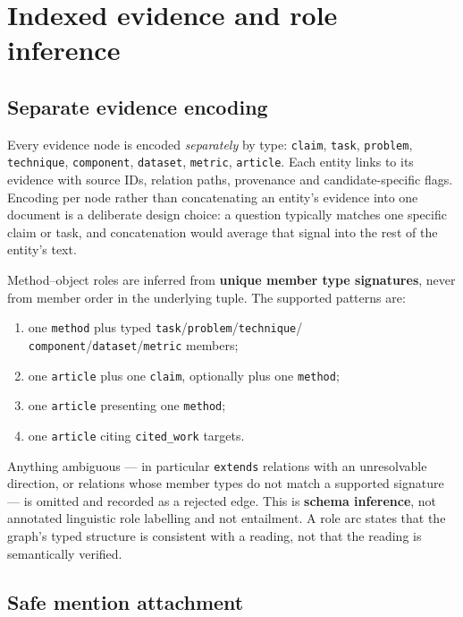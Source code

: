 \documentclass[11pt,a4paper]{article}
\begin{document}
\section{Indexed evidence and role inference}

\subsection{Separate evidence encoding}

Every evidence node is encoded \emph{separately} by type: \texttt{claim}, \texttt{task}, \texttt{problem},
\texttt{technique}, \texttt{component}, \texttt{dataset}, \texttt{metric}, \texttt{article}. Each entity
links to its evidence with source IDs, relation paths, provenance and candidate-specific flags. Encoding per
node rather than concatenating an entity's evidence into one document is a deliberate design choice: a
question typically matches one specific claim or task, and concatenation would average that signal into the
rest of the entity's text.

Method--object roles are inferred from \textbf{unique member type signatures}, never from member order in
the underlying tuple. The supported patterns are:

\begin{enumerate}
\item one \texttt{method} plus typed \texttt{task}/\texttt{problem}/\texttt{technique}/
\texttt{component}/\texttt{dataset}/\texttt{metric} members;
\item one \texttt{article} plus one \texttt{claim}, optionally plus one \texttt{method};
\item one \texttt{article} presenting one \texttt{method};
\item one \texttt{article} citing \texttt{cited\_work} targets.
\end{enumerate}

Anything ambiguous --- in particular \texttt{extends} relations with an unresolvable direction, or relations
whose member types do not match a supported signature --- is omitted and recorded as a rejected edge. This is
\textbf{schema inference}, not annotated linguistic role labelling and not entailment. A role arc states
that the graph's typed structure is consistent with a reading, not that the reading is semantically
verified.

\subsection{Safe mention attachment}
\end{document}
